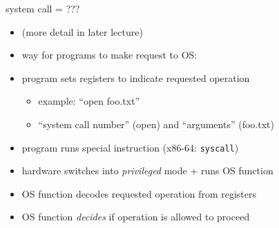 \begin{frame}{system call = ???}

	\begin{itemize}
	\item (more detail in later lecture)
        \item way for programs to make request to OS:
        \item program sets registers to indicate requested operation 
            \begin{itemize}
            \item example: ``open foo.txt''
            \item ``system call number'' (open) and ``arguments'' (foo.txt)
            \end{itemize}
	\item program runs special instruction (x86-64: \texttt{syscall})
	\item hardware switches into \textit{privileged} mode + runs OS function
        \item OS function decodes requested operation from registers
        \item OS function \textit{decides} if operation is allowed to proceed
	\end{itemize}
\end{frame}

